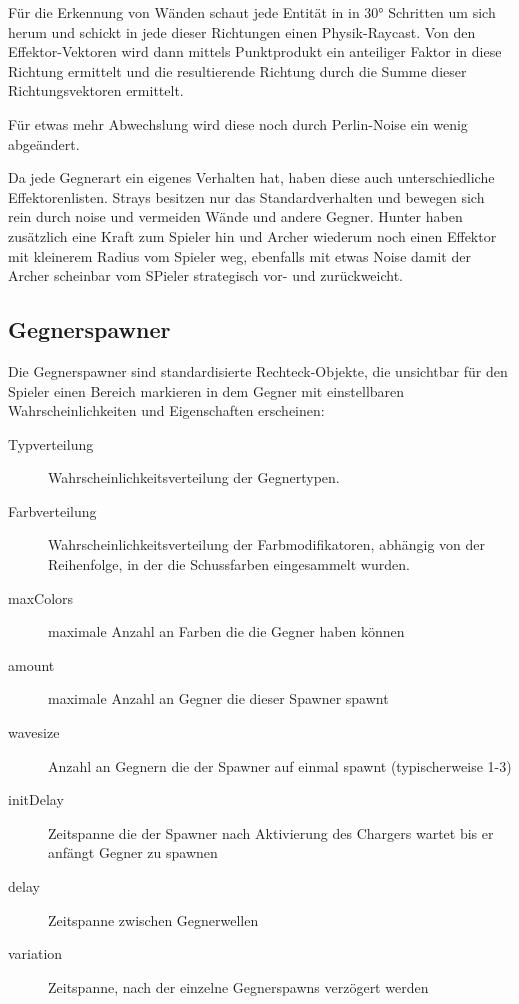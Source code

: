 \documentclass[a4paper,10pt,ngerman,fontsize=12pt]{scrreprt}
\begin{document}
Für die Erkennung von Wänden schaut jede Entität in in 30° Schritten um sich herum und schickt in jede dieser Richtungen einen Physik-Raycast. Von den Effektor-Vektoren wird dann  mittels Punktprodukt ein anteiliger Faktor in diese Richtung ermittelt und die resultierende Richtung durch die Summe dieser Richtungsvektoren ermittelt.

Für etwas mehr Abwechslung wird diese noch durch Perlin-Noise ein wenig abgeändert.

Da jede Gegnerart ein eigenes Verhalten hat, haben diese auch unterschiedliche Effektorenlisten. Strays besitzen nur das Standardverhalten und bewegen sich rein durch noise und vermeiden Wände und andere Gegner. Hunter haben zusätzlich eine Kraft zum Spieler hin und Archer wiederum noch einen Effektor mit kleinerem Radius vom Spieler weg, ebenfalls mit etwas Noise damit der Archer scheinbar vom SPieler strategisch vor- und zurückweicht.



\subsection{Gegnerspawner}
\label{subsect:spawner}

Die Gegnerspawner sind standardisierte Rechteck-Objekte, die unsichtbar für den Spieler einen Bereich markieren in dem Gegner mit einstellbaren Wahrscheinlichkeiten und Eigenschaften erscheinen:

\begin{description}
\item[Typverteilung] Wahrscheinlichkeitsverteilung der Gegnertypen.
\item[Farbverteilung] Wahrscheinlichkeitsverteilung der Farbmodifikatoren, abhängig von der Reihenfolge, in der die Schussfarben eingesammelt wurden.
\item[maxColors] maximale Anzahl an Farben die die Gegner haben können
\item[amount] maximale Anzahl an Gegner die dieser Spawner spawnt
\item[wavesize] Anzahl an Gegnern die der Spawner auf einmal spawnt (typischerweise 1-3)
\item[initDelay] Zeitspanne die der Spawner nach Aktivierung des Chargers wartet bis er anfängt Gegner zu spawnen
\item[delay] Zeitspanne zwischen Gegnerwellen
\item[variation] Zeitspanne, nach der einzelne Gegnerspawns verzögert werden
\end{description}
\end{document}
